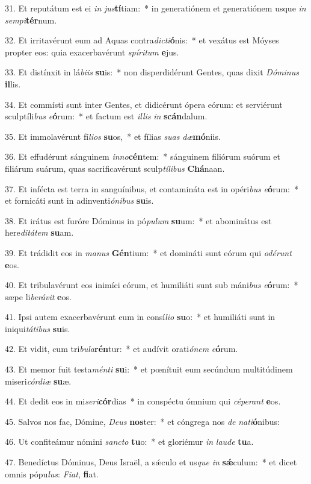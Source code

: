 31. Et reputátum est ei \textit{in} \textit{jus}\textbf{tí}tiam:~*  in generatiónem et generatiónem usque \textit{in} \textit{sem}\textit{pi}\textbf{tér}num.\

32. Et irritavérunt eum ad Aquas contra\textit{dic}\textit{ti}\textbf{ó}nis:~*  et vexátus est Móyses propter eos: quia exacerbavérunt \textit{spí}\textit{ri}\textit{tum} \textbf{e}jus.\

33. Et distínxit in lá\textit{bi}\textit{is} \textbf{su}is:~*  non disperdidérunt Gentes, quas dixit \textit{Dó}\textit{mi}\textit{nus} \textbf{il}lis.\

34. Et commísti sunt inter Gentes, et didicérunt ópera eórum: et serviérunt sculptíli\textit{bus} \textit{e}\textbf{ó}rum:~*  et factum est \textit{il}\textit{lis} \textit{in} \textbf{scán}dalum.\

35. Et immolavérunt fí\textit{li}\textit{os} \textbf{su}os,~*  et fílias \textit{su}\textit{as} \textit{dæ}\textbf{mó}niis.\

36. Et effudérunt sánguinem \textit{in}\textit{no}\textbf{cén}tem:~*  sánguinem filiórum suórum et filiárum suárum, quas sacrificavérunt sculp\textit{tí}\textit{li}\textit{bus} \textbf{Chá}naan.\

37. Et infécta est terra in sanguínibus, et contamináta est in opéri\textit{bus} \textit{e}\textbf{ó}rum:~*  et fornicáti sunt in adinventi\textit{ó}\textit{ni}\textit{bus} \textbf{su}is.\

38. Et irátus est furóre Dóminus in pó\textit{pu}\textit{lum} \textbf{su}um:~*  et abominátus est here\textit{di}\textit{tá}\textit{tem} \textbf{su}am.\

39. Et trádidit eos in \textit{ma}\textit{nus} \textbf{Gén}tium:~*  et domináti sunt eórum qui \textit{o}\textit{dé}\textit{runt} \textbf{e}os.\

40. Et tribulavérunt eos inimíci eórum, et humiliáti sunt sub máni\textit{bus} \textit{e}\textbf{ó}rum:~*  sæpe li\textit{be}\textit{rá}\textit{vit} \textbf{e}os.\

41. Ipsi autem exacerbavérunt eum in consí\textit{li}\textit{o} \textbf{su}o:~*  et humiliáti sunt in iniqui\textit{tá}\textit{ti}\textit{bus} \textbf{su}is.\

42. Et vidit, cum tri\textit{bu}\textit{la}\textbf{rén}tur:~*  et audívit orati\textit{ó}\textit{nem} \textit{e}\textbf{ó}rum.\

43. Et memor fuit testa\textit{mén}\textit{ti} \textbf{su}i:~*  et pœnítuit eum secúndum multitúdinem miseri\textit{cór}\textit{di}\textit{æ} \textbf{su}æ.\

44. Et dedit eos in mi\textit{se}\textit{ri}\textbf{cór}dias~*  in conspéctu ómnium qui \textit{cé}\textit{pe}\textit{rant} \textbf{e}os.\

45. Salvos nos fac, Dómine, \textit{De}\textit{us} \textbf{nos}ter:~*  et cóngrega nos \textit{de} \textit{na}\textit{ti}\textbf{ó}nibus:\

46. Ut confiteámur nómini \textit{sanc}\textit{to} \textbf{tu}o:~*  et gloriémur \textit{in} \textit{lau}\textit{de} \textbf{tu}a.\

47. Benedíctus Dóminus, Deus Israël, a sǽculo et us\textit{que} \textit{in} \textbf{sǽ}culum:~*  et dicet omnis pópu\textit{lus}: \textit{Fi}\textit{at}, \textbf{fi}at.\

